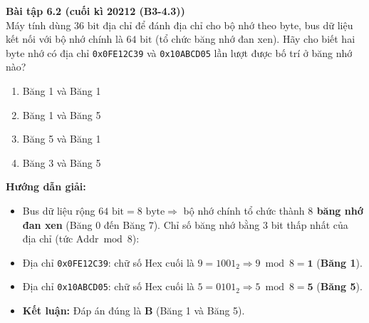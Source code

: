 \textbf{Bài tập 6.2 (cuối kì 20212 (B3-4.3))}\\
Máy tính dùng $36\text{ bit}$ địa chỉ để đánh địa chỉ cho bộ nhớ theo byte, bus dữ liệu kết nối với bộ nhớ chính là $64\text{ bit}$ (tổ chức băng nhớ đan xen). Hãy cho biết hai byte nhớ có địa chỉ \texttt{0x0FE12C39} và \texttt{0x10ABCD05} lần lượt được bố trí ở băng nhớ nào?
\begin{enumerate}[label=\Alph*.]
    \item Băng 1 và Băng 1
    \item Băng 1 và Băng 5
    \item Băng 5 và Băng 1
    \item Băng 3 và Băng 5
\end{enumerate}
\textbf{Hướng dẫn giải:}
\begin{itemize}
    \item Bus dữ liệu rộng $64\text{ bit} = 8\text{ byte} \Rightarrow$ bộ nhớ chính tổ chức thành \textbf{$8$ băng nhớ đan xen} (Băng $0$ đến Băng $7$). Chỉ số băng nhớ bằng $3$ bit thấp nhất của địa chỉ (tức $\text{Addr} \bmod 8$):
    \item Địa chỉ \texttt{0x0FE12C39}: chữ số Hex cuối là $\text{9} = 1001_2 \Rightarrow 9 \bmod 8 = \mathbf{1}$ (\textbf{Băng 1}).
    \item Địa chỉ \texttt{0x10ABCD05}: chữ số Hex cuối là $\text{5} = 0101_2 \Rightarrow 5 \bmod 8 = \mathbf{5}$ (\textbf{Băng 5}).
    \item \textbf{Kết luận:} Đáp án đúng là \textbf{B} (Băng 1 và Băng 5).
\end{itemize}

